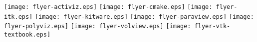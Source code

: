 \newpage
\thispagestyle{empty}
\texttt{[image: flyer-activiz.eps]}
\newpage
\thispagestyle{empty}
\texttt{[image: flyer-cmake.eps]}
\newpage
\thispagestyle{empty}
\texttt{[image: flyer-itk.eps]}
\newpage
\thispagestyle{empty}
\texttt{[image: flyer-kitware.eps]}
\newpage
\thispagestyle{empty}
\texttt{[image: flyer-paraview.eps]}
\newpage
\thispagestyle{empty}
\texttt{[image: flyer-polyviz.eps]}
\newpage
\thispagestyle{empty}
\texttt{[image: flyer-volview.eps]}
\newpage
\thispagestyle{empty}
\texttt{[image: flyer-vtk-textbook.eps]}
